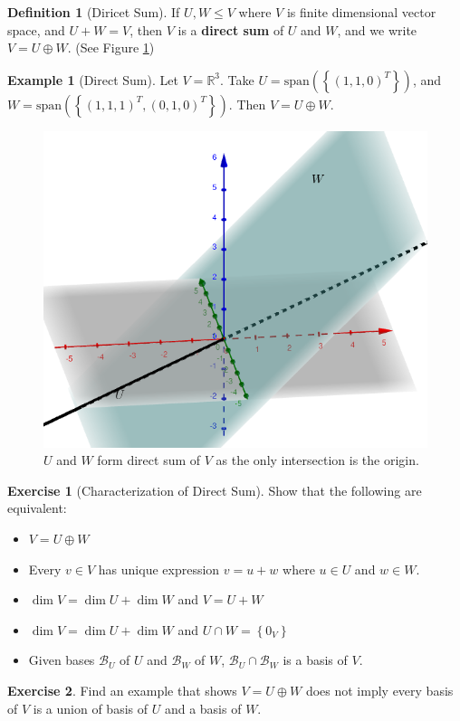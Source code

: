 \documentclass[12pt, a4paper]{article}
\newcommand{\R}{\mathbb{R}}
\newcommand{\spantext}{\text{span}}
\theoremstyle{remark}
\theoremstyle{definition}
\newtheorem{definition}{Definition}
\newtheorem{example}{Example}
\newtheorem{exercise}{Exercise}
\numberwithin{equation}{section}
\numberwithin{definition}{section}
\numberwithin{example}{section}
\numberwithin{exercise}{section}
\numberwithin{remark}{section}
\numberwithin{figure}{section}
\begin{document}
\begin{definition}[Diricet Sum]
    If $U,W \leq V$ where $V$ is finite dimensional vector space,
    and $U+W = V$, then $V$ is a \textbf{direct sum} of $U$ and $W$, and
    we write $V = U \oplus W$.
    (See Figure \ref{fig: Direct Sum})
\end{definition}
\begin{example}[Direct Sum]
    Let $V = \R^3$.
    Take $U = \spantext \left( \left\{ \left( 1, 1, 0 \right)^T \right\} \right)$,
    and $W = \spantext \left( \left\{ \left( 1, 1, 1 \right)^T, \left( 0, 1, 0 \right)^T \right\} \right)$.
    Then $V = U \oplus W$.
    \begin{figure}[h]
        \centering
        \includegraphics[scale=0.4]{DirectSum}
        \caption{$U$ and $W$ form direct sum of $V$ as the only intersection is the origin.}
        \label{fig: Direct Sum}
    \end{figure}
\end{example}
\begin{exercise}[Characterization of Direct Sum]
    Show that the following are equivalent:
    \begin{itemize}
        \item $V = U \oplus W$
        \item Every $v \in V$ has unique expression $v = u+w$ where $u \in U$ and $w \in W$.
        \item $\dim V = \dim U + \dim W$ and $V = U + W$
        \item $\dim V = \dim U + \dim W$ and $U \cap W = \left\{ 0_V \right\}$
        \item Given bases $\mathcal{B}_U$ of $U$ and $\mathcal{B}_W$ of $W$, $\mathcal{B}_U \cap \mathcal{B}_W$ is a basis of $V$.
    \end{itemize}
\end{exercise}
\begin{exercise}
    Find an example that shows $V = U \oplus W$ does not imply every basis of $V$ is a union of basis of $U$ and a basis of $W$.
\end{exercise}
\end{document}
